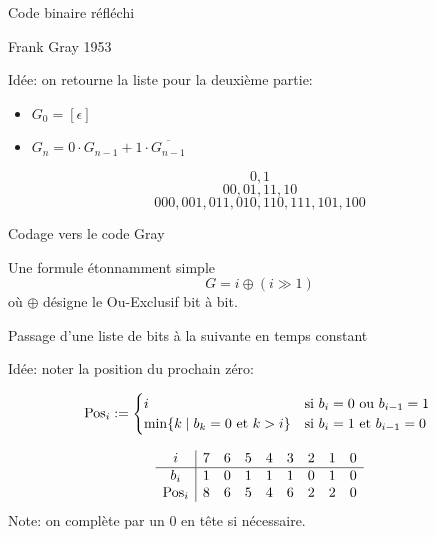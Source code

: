 \documentclass{beamer}
\begin{document}
\begin{frame}{Code binaire réfléchi}

  Frank Gray 1953
  \bigskip

  \begin{DEFN}
    Idée: on retourne la liste pour la deuxième partie:
    \begin{itemize}
    \item $G_0= [\epsilon]$
    \item $G_n= 0\cdot G_{n-1} + 1\cdot \overline{G_{n-1}}$
    \end{itemize}
  \end{DEFN}
  \[0, 1\]
  \[00, 01, 11, 10\]
  \[000, 001, 011, 010, 110, 111, 101, 100\]
\end{frame}

\begin{frame}{Codage vers le code Gray}

  \begin{NOTE}
    Une formule étonnamment simple
    \[G = i \oplus (i \gg 1)\]
    où $\oplus$ désigne le Ou-Exclusif bit à bit.
  \end{NOTE}
\end{frame}


\begin{frame}{Passage d'une liste de bits à la suivante en temps constant}

Idée: noter la position du prochain zéro:
\begin{NOTE}
  \[ \operatorname{Pos}_i :=
  \begin{cases}
    i & \text{si $b_i=0$ ou $b_{i-1}=1$ } \\
    \min\{k \mid b_k = 0 \text{ et } k > i\} & \text{si $b_i=1$ et $b_{i-1}=0$ } \\
  \end{cases}
  \]
\end{NOTE}
\[\begin{array}{c|cccccccc}
i      &  7 & 6 & 5 & 4 & 3 & 2 & 1 & 0 \\\hline
b_i    &  1 & 0 & 1 & 1 & 1 & 0 & 1 & 0 \\
\operatorname{Pos}_i &  8 & 6 & 5 & 4 & 6 & 2 & 2 & 0 \\
  \end{array}\]
Note: on complète par un $0$ en tête si nécessaire.
\end{frame}
\end{document}

